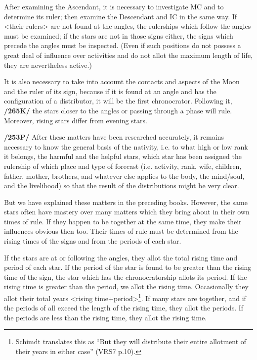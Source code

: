 After examining the Ascendant, it is necessary to investigate MC and to determine its ruler; then examine the Descendant and IC in the same way. If <their rulers> are not found at the angles, the rulerships which follow the angles must be examined; if the stars are not in those signs either, the signs which precede the angles must be inspected. (Even if such positions do not possess a great deal of influence over activities and do not allot the maximum length of life, they are nevertheless active.) 

It is also necessary to take into account the contacts and aspects of the Moon and the ruler of its sign, because if it is found at an angle and has the configuration of a distributor, it will be the first chronocrator.
Following it, \textbf{/265K/} the stars closer to the angles or passing through a phase will rule. Moreover, rising stars differ from evening stars.

\textbf{/253P/} After  these matters have been researched accurately, it remains necessary to know the general basis of the nativity, i.e. to what high or low rank it belongs, the harmful and the helpful stars, which star has been assigned the rulership of which place and type of forecast (i.e. activity, rank, wife, children, father, mother, brothers, and whatever else applies to the body, the mind/soul, and the livelihood) so that the result of the distributions might be very clear.

But we have explained these matters in the preceding books. However, the same stars often have mastery over many matters which they bring about in their own times of rule. If they happen to be together at the same time, they make their influences obvious then too. Their times of rule must be determined from the rising times of the signs and from the periods of each star. 

If  the stars are at or following the angles, they allot the total rising time and period of each star. If the period of the star is found to be greater than the rising time of the sign, the star which has the chronocratorship allots its period. If the rising time
is greater than the period, we allot the rising time. Occasionally they allot their total years <rising time+period>\footnote{Schimdt translates this as ``But they will distribute their entire allotment of their years in either case'' (VRS7 p.10).}. If many stars are together, and if the periods of all exceed the length of the rising time, they allot the periods. If the periods are less than the rising time, they allot the rising time. 

